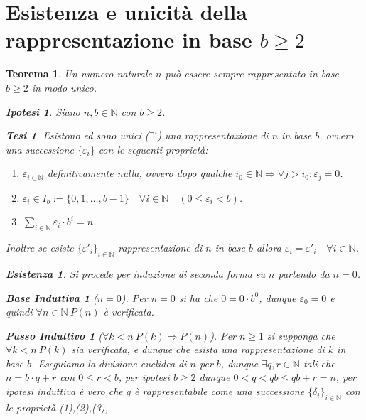 \documentclass{article}
\makeatletter
\renewenvironment{proof}[1][\proofname]{\par
    \pushQED{\qed}%
    \normalfont \topsep6\p@\@plus6\p@\relax
    \trivlist
    \item\relax
    {\itshape
    #1\@addpunct{.}}\hspace\labelsep\ignorespaces
    }{%
    \popQED\endtrivlist\@endpefalse
}
\newtheorem{theorem}{Teorema}[part]
\newtheorem{ipothesis}[lemma]{Ipotesi}
\newtheorem{thesis}[lemma]{Tesi}
\theoremstyle{definition}
\newtheorem*{existence}{Esistenza}
\newtheorem*{base}{Base Induttiva}
\newtheorem*{step}{Passo Induttivo}
\makeatother
\begin{document}
\section{Esistenza e unicità della rappresentazione in base \(b\ge 2\)}
\begin{theorem}
    Un numero naturale \(n\) può essere sempre rappresentato in base \(b\ge 2\) in modo unico.
    \begin{ipothesis}
        Siano \(n,b\in\mathbb{N}\) con \(b\ge 2\).
    \end{ipothesis}
    \begin{thesis}
        Esistono ed sono unici (\(\exists!\)) una rappresentazione di \(n\) in base \(b\), ovvero una successione \(\{\varepsilon_i\}\) con le seguenti proprietà:
        \begin{enumerate}
            \item \(\varepsilon_{i\in\mathbb{N}}\) definitivamente nulla, ovvero dopo qualche \(i_0\in\mathbb{N}\Rightarrow \forall j>i_0: \varepsilon_j=0\).
            \item \(\varepsilon_i\in I_b:=\{0,1,\ldots,b-1\}\quad \forall i\in\mathbb{N}\quad (0\leq\varepsilon_i< b)\).
            \item \(\displaystyle\sum_{i\in\mathbb{N}} \varepsilon_i\cdot b^i=n\).
        \end{enumerate}
        Inoltre se esiste \(\{\varepsilon'_i\}_{i\in\mathbb{N}}\) rappresentazione di \(n\) in base \(b\) allora \(\varepsilon_i=\varepsilon'_i\quad \forall i\in\mathbb{N}\).
    \end{thesis}
    \begin{proof}
        \begin{existence}
            Si procede per induzione di seconda forma su \(n\) partendo da \(n=0\).
            \begin{base}[$n=0$] 
                Per \(n=0\) si ha che \(0=0\cdot b^0\), dunque \(\varepsilon_0=0\) e quindi \(\forall n\in\mathbb{N}\ P(n)\) è verificata.\end{base}
            \begin{step}[$\forall k<n\ P(k)\Rightarrow P(n)$]
                Per \(n\geq 1\) si supponga che \(\forall k<n\ P(k)\) sia verificata, e dunque che esista una rappresentazione di \(k\) in base \(b\). Eseguiamo la divisione euclidea di \(n\) per \(b\), dunque \(\exists q,r\in\mathbb{N}\) tali che \(n=b\cdot q+r\) con \(0\leq r<b\), per ipotesi \(b\geq 2\) dunque \(0<q<qb\leq qb+r=n\),
                per ipotesi induttiva è vero che \(q\) è rappresentabile come una successione \(\{\delta_i\}_{i\in\mathbb{N}}\) con le proprietà (1),(2),(3),

\end{step}
\end{existence}
\end{proof}
\end{theorem}
\end{document}
